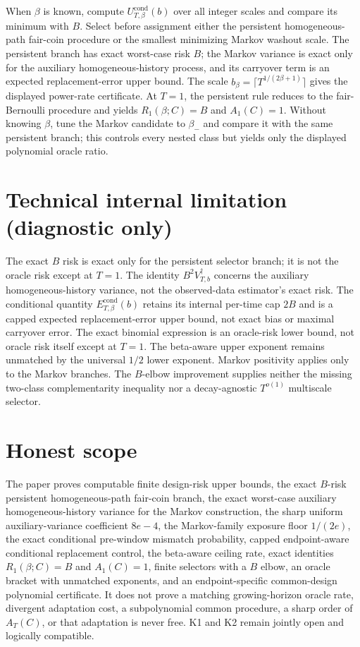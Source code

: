\documentclass{article}
\begin{document}
When \(\beta\) is known, compute \(U_{T,\beta}^{\mathrm{cond}}(b)\) over all integer scales and compare its minimum with \(B\). Select before assignment either the persistent homogeneous-path fair-coin procedure or the smallest minimizing Markov washout scale. The persistent branch has exact worst-case risk \(B\); the Markov variance is exact only for the auxiliary homogeneous-history process, and its carryover term is an expected replacement-error upper bound. The scale \(b_\beta=\lceil T^{1/(2\beta+1)}\rceil\) gives the displayed power-rate certificate. At \(T=1\), the persistent rule reduces to the fair-Bernoulli procedure and yields \(R_1(\beta;C)=B\) and \(A_1(C)=1\). Without knowing \(\beta\), tune the Markov candidate to \(\beta_-\) and compare it with the same persistent branch; this controls every nested class but yields only the displayed polynomial oracle ratio.

\section*{Technical internal limitation (diagnostic only)}

The exact \(B\) risk is exact only for the persistent selector branch; it is not the oracle risk except at \(T=1\). The identity \(B^2V_{T,b}^{\dagger}\) concerns the auxiliary homogeneous-history variance, not the observed-data estimator's exact risk. The conditional quantity \(E_{T,\beta}^{\mathrm{cond}}(b)\) retains its internal per-time cap \(2B\) and is a capped expected replacement-error upper bound, not exact bias or maximal carryover error. The exact binomial expression is an oracle-risk lower bound, not oracle risk itself except at \(T=1\). The beta-aware upper exponent remains unmatched by the universal \(1/2\) lower exponent. Markov positivity applies only to the Markov branches. The \(B\)-elbow improvement supplies neither the missing two-class complementarity inequality nor a decay-agnostic \(T^{o(1)}\) multiscale selector.

\section{Honest scope}

The paper proves computable finite design-risk upper bounds, the exact \(B\)-risk persistent homogeneous-path fair-coin branch, the exact worst-case auxiliary homogeneous-history variance for the Markov construction, the sharp uniform auxiliary-variance coefficient \(8e-4\), the Markov-family exposure floor \(1/(2e)\), the exact conditional pre-window mismatch probability, capped endpoint-aware conditional replacement control, the beta-aware ceiling rate, exact identities \(R_1(\beta;C)=B\) and \(A_1(C)=1\), finite selectors with a \(B\) elbow, an oracle bracket with unmatched exponents, and an endpoint-specific common-design polynomial certificate. It does not prove a matching growing-horizon oracle rate, divergent adaptation cost, a subpolynomial common procedure, a sharp order of \(A_T(C)\), or that adaptation is never free. K1 and K2 remain jointly open and logically compatible.
\end{document}
